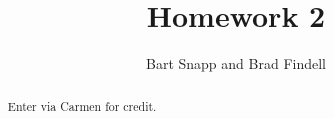 \documentclass[handout]{xourse}
\title{Homework 2}
\author{Bart Snapp and Brad Findell}
\begin{document}
\begin{abstract}
Enter via Carmen for credit. 
\end{abstract}
\maketitle

\end{document}
